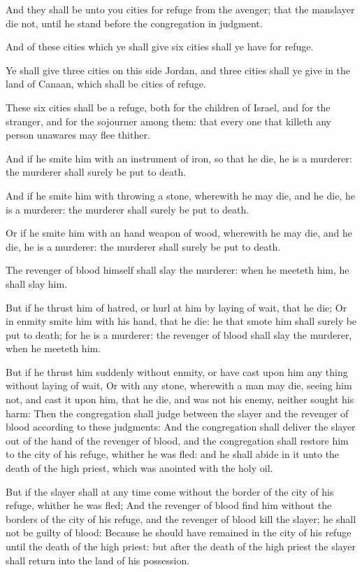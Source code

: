 \Verse And they shall be unto you cities for refuge from the avenger;
that the manslayer die not, until he stand before the congregation in
judgment.

\Verse And of these cities which ye shall give six cities shall ye have
for refuge.

\Verse Ye shall give three cities on this side Jordan, and three cities
shall ye give in the land of Canaan, which shall be cities of refuge.

\Verse These six cities shall be a refuge, both for the children of
Israel, and for the stranger, and for the sojourner among them: that
every one that killeth any person unawares may flee thither.

\Verse And if he smite him with an instrument of iron, so that he die,
he is a murderer: the murderer shall surely be put to death.

\Verse And if he smite him with throwing a stone, wherewith he may die,
and he die, he is a murderer: the murderer shall surely be put to
death.

\Verse Or if he smite him with an hand weapon of wood, wherewith he may
die, and he die, he is a murderer: the murderer shall surely be put to
death.

\Verse The revenger of blood himself shall slay the murderer: when he
meeteth him, he shall slay him.

\Verse But if he thrust him of hatred, or hurl at him by laying of
wait, that he die; \Verse Or in enmity smite him with his hand, that he
die: he that smote him shall surely be put to death; for he is a
murderer: the revenger of blood shall slay the murderer, when he
meeteth him.

\Verse But if he thrust him suddenly without enmity, or have cast upon
him any thing without laying of wait, \Verse Or with any stone,
wherewith a man may die, seeing him not, and cast it upon him, that he
die, and was not his enemy, neither sought his harm: \Verse Then the
congregation shall judge between the slayer and the revenger of blood
according to these judgments: \Verse And the congregation shall deliver
the slayer out of the hand of the revenger of blood, and the
congregation shall restore him to the city of his refuge, whither he
was fled: and he shall abide in it unto the death of the high priest,
which was anointed with the holy oil.

\Verse But if the slayer shall at any time come without the border of
the city of his refuge, whither he was fled; \Verse And the revenger of
blood find him without the borders of the city of his refuge, and the
revenger of blood kill the slayer; he shall not be guilty of blood:
\Verse Because he should have remained in the city of his refuge until
the death of the high priest: but after the death of the high priest
the slayer shall return into the land of his possession.

